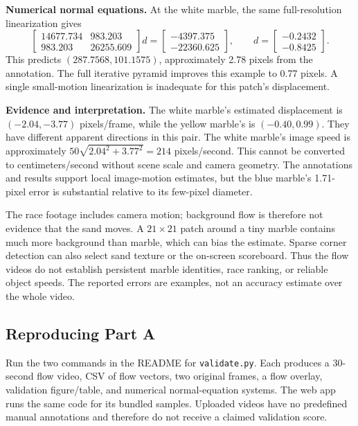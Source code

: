 \documentclass[10pt,letterpaper]{article}
\begin{document}
\textbf{Numerical normal equations.} At the white marble, the same full-resolution
linearization gives
\[
\begin{bmatrix}14677.734&983.203\\983.203&26255.609\end{bmatrix}d
=\begin{bmatrix}-4397.375\\-22360.625\end{bmatrix},\qquad
d=\begin{bmatrix}-0.2432\\-0.8425\end{bmatrix}.
\]
This predicts $(287.7568,101.1575)$, approximately 2.78 pixels from the annotation.
The full iterative pyramid improves this example to 0.77 pixels. A single small-motion
linearization is inadequate for this patch's displacement.

\textbf{Evidence and interpretation.} The white marble's estimated displacement is
$(-2.04,-3.77)$ pixels/frame, while the yellow marble's is $(-0.40,0.99)$.
They have different apparent directions in this pair. The white marble's image
speed is approximately $50\sqrt{2.04^2+3.77^2}=214$ pixels/second. This cannot be
converted to centimeters/second without scene scale and camera geometry.
The annotations and results support local image-motion estimates, but the blue
marble's 1.71-pixel error is substantial relative to its few-pixel diameter.

The race footage includes camera motion; background flow is therefore not evidence
that the sand moves. A $21\times21$ patch around a tiny marble contains much more
background than marble, which can bias the estimate. Sparse corner detection can
also select sand texture or the on-screen scoreboard. Thus the flow videos do not
establish persistent marble identities, race ranking, or reliable object speeds.
The reported errors are examples, not an accuracy estimate over the whole video.

\subsection*{Reproducing Part A}
Run the two commands in the README for \texttt{validate.py}. Each produces a
30-second flow video, CSV of flow vectors, two original frames, a flow overlay,
validation figure/table, and numerical normal-equation systems. The web app runs
the same code for its bundled samples. Uploaded videos have no predefined manual
annotations and therefore do not receive a claimed validation score.
\end{document}
